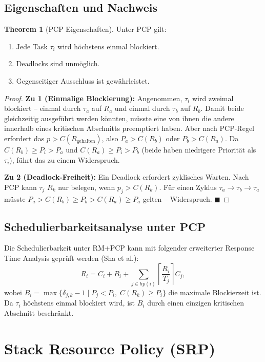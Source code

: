 ﻿\documentclass[a4paper,12pt]{report}
\theoremstyle{definition}
\newtheorem{theorem}{Theorem}[chapter]
\begin{document}
\subsection{Eigenschaften und Nachweis}

\begin{theorem}[PCP Eigenschaften]
	\label{thm:pcp}
	Unter PCP gilt:
	\begin{enumerate}
		\item Jede Task $\tau_i$ wird höchstens einmal blockiert.
		\item Deadlocks sind unmöglich.
		\item Gegenseitiger Ausschluss ist gewährleistet.
	\end{enumerate}
\end{theorem}

\begin{proof}
	\textbf{Zu 1 (Einmalige Blockierung):} Angenommen, $\tau_i$ wird zweimal
	blockiert -- einmal durch $\tau_a$ auf $R_a$ und einmal durch $\tau_b$ auf $R_b$.
	Damit beide gleichzeitig ausgeführt werden könnten, müsste eine von ihnen die
	andere innerhalb eines kritischen Abschnitts preemptiert haben. Aber nach PCP-Regel
	erfordert das $p > C(R_{\text{gehalten}})$, also $P_a > C(R_b)$ oder $P_b > C(R_a)$.
	Da $C(R_b) \geq P_i > P_a$ und $C(R_a) \geq P_i > P_b$ (beide haben niedrigere
	Priorität als $\tau_i$), führt das zu einem Widerspruch.

	\textbf{Zu 2 (Deadlock-Freiheit):} Ein Deadlock erfordert zyklisches Warten.
	Nach PCP kann $\tau_j$ $R_k$ nur belegen, wenn $p_j > C(R_k)$. Für einen Zyklus
	$\tau_a \to \tau_b \to \tau_a$ müsste $P_a > C(R_b) \geq P_b > C(R_a) \geq P_a$
	gelten -- Widerspruch. \hfill$\blacksquare$
\end{proof}

\subsection{Schedulierbarkeitsanalyse unter PCP}

Die Schedulierbarkeit unter RM+PCP kann mit folgender erweiterter Response Time Analysis
geprüft werden (Sha et al.):
\[
	R_i = C_i + B_i + \sum_{j \in hp(i)} \left\lceil \frac{R_i}{T_j} \right\rceil C_j,
\]
wobei $B_i = \max\{\delta_{j,k}-1 \mid P_j < P_i,\; C(R_k) \geq P_i\}$ die maximale
Blockierzeit ist. Da $\tau_i$ höchstens einmal blockiert wird, ist $B_i$ durch einen
einzigen kritischen Abschnitt beschränkt.

\section{Stack Resource Policy (SRP)}
\end{document}
